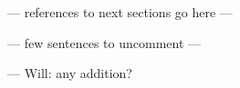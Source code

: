 






--- references to next sections go here ---

--- few sentences to uncomment --- 

--- Will: any addition?




